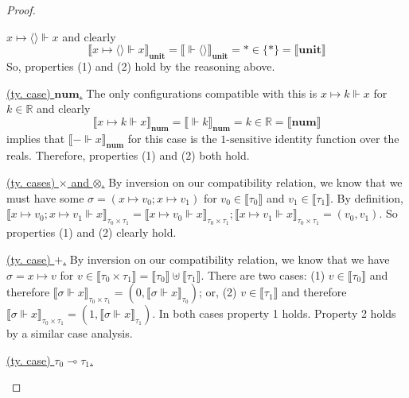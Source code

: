 \begin{proof}
\begin{description}
\begin{description}
\begin{description}
            $x \mapsto \langle \rangle \Vdash x$ and clearly 
            $$\llbracket x \mapsto \langle \rangle \Vdash x
            \rrbracket_{\textbf{unit}} = \llbracket \Vdash \langle \rangle
            \rrbracket_{\textbf{unit}} = * \in \{ * \} = \llbracket \textbf{unit}
            \rrbracket$$
            So, properties (1) and (2) hold by the reasoning above.
          \item{\underline{(ty. case) $\mathbf{num}$.}} 
            The only configurations compatible
            with this is $x \mapsto k \Vdash x$ for $k \in \mathbb{R}$ and
            clearly $$\llbracket x \mapsto k \Vdash x \rrbracket_{\textbf{num}}
            = \llbracket \Vdash k \rrbracket_{\textbf{num}} = k \in \mathbb{R} =
            \llbracket \textbf{num} \rrbracket$$ implies that $\llbracket -
            \Vdash x \rrbracket_{\mathbf{num}}$ for this case is the
            $\text{1-sensitive}$ identity function over the reals. Therefore,
            properties (1) and (2) both hold.
          \item{\underline{(ty. cases) $\times$ and $\otimes$.}} By inversion on
            our compatibility relation, we know that we must have some $\sigma =
            (x \mapsto v_0; x \mapsto v_1)$ for $v_0 \in \llbracket \tau_0
            \rrbracket$ and $v_1 \in \llbracket \tau_1 \rrbracket$. By
            definition, $\llbracket x \mapsto v_0; x \mapsto v_1 \Vdash x
            \rrbracket_{\tau_0 \times \tau_1} = \llbracket x \mapsto v_0 \Vdash
            x \rrbracket_{\tau_0 \times \tau_1}; \llbracket x \mapsto v_1 \Vdash
            x \rrbracket_{\tau_0 \times \tau_1} = (v_0, v_1)$. So properties (1)
            and (2) clearly hold.
          \item{\underline{(ty. case) $+$.}} By inversion on our compatibility
            relation, we know that we have $\sigma = x \mapsto v$ for $v \in
            \llbracket \tau_0 \times \tau_1 \rrbracket = \llbracket \tau_0
            \rrbracket \uplus \llbracket \tau_1 \rrbracket$. 
            There are two cases: 
            (1) $v \in \llbracket \tau_0 \rrbracket$ and therefore
            $\llbracket \sigma \Vdash x \rrbracket_{\tau_0 \times \tau_1} = (0,
            \llbracket \sigma \Vdash x \rrbracket_{\tau_0})$; 
            or, (2) $v \in \llbracket \tau_1 \rrbracket$ and therefore
            $\llbracket \sigma \Vdash x \rrbracket_{\tau_0 \times \tau_1} = (1,
            \llbracket \sigma \Vdash x \rrbracket_{\tau_1})$. In both cases
            property 1 holds. Property 2 holds by a similar case analysis.
          \item{\underline{(ty. case) $\tau_0 \multimap \tau_1$.}} 

\end{description}
\end{description}
\end{description}
\end{proof}
